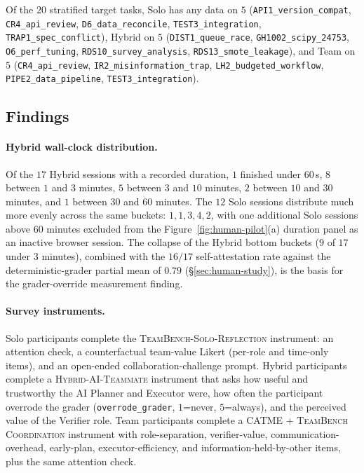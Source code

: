 \documentclass{article}
\begin{document}
Of the $20$ stratified target tasks, Solo has any data on $5$ (\texttt{API1\_version\_compat}, \texttt{CR4\_api\_review}, \texttt{D6\_data\_reconcile}, \texttt{TEST3\_integration}, \texttt{TRAP1\_spec\_conflict}), Hybrid on $5$ (\texttt{DIST1\_queue\_race}, \texttt{GH1002\_scipy\_24753}, \texttt{O6\_perf\_tuning}, \texttt{RDS10\_survey\_analysis}, \texttt{RDS13\_smote\_leakage}), and Team on $5$ (\texttt{CR4\_api\_review}, \texttt{IR2\_misinformation\_trap}, \texttt{LH2\_budgeted\_workflow}, \texttt{PIPE2\_data\_pipeline}, \texttt{TEST3\_integration}).

\subsection{Findings}
\label{app:human-measurement}

\paragraph{Hybrid wall-clock distribution.} Of the $17$ Hybrid sessions with a recorded duration, $1$ finished under $60$\,s, $8$ between $1$ and $3$ minutes, $5$ between $3$ and $10$ minutes, $2$ between $10$ and $30$ minutes, and $1$ between $30$ and $60$ minutes. The $12$ Solo sessions distribute much more evenly across the same buckets: $1, 1, 3, 4, 2$, with one additional Solo sessions above $60$ minutes excluded from the Figure~\ref{fig:human-pilot}(a) duration panel as an inactive browser session. The collapse of the Hybrid bottom buckets ($9$ of $17$ under $3$ minutes), combined with the $16 / 17$ self-attestation rate against the deterministic-grader partial mean of $0.79$ (\S\ref{sec:human-study}), is the basis for the grader-override measurement finding.

\paragraph{Survey instruments.} Solo participants complete the \textsc{TeamBench-Solo-Reflection} instrument: an attention check, a counterfactual team-value Likert (per-role and time-only items), and an open-ended collaboration-challenge prompt. Hybrid participants complete a \textsc{Hybrid-AI-Teammate} instrument that asks how useful and trustworthy the AI Planner and Executor were, how often the participant overrode the grader (\texttt{overrode\_grader}, $1$=never, $5$=always), and the perceived value of the Verifier role. Team participants complete a \textsc{CATME + TeamBench Coordination} instrument with role-separation, verifier-value, communication-overhead, early-plan, executor-efficiency, and information-held-by-other items, plus the same attention check.
\end{document}
